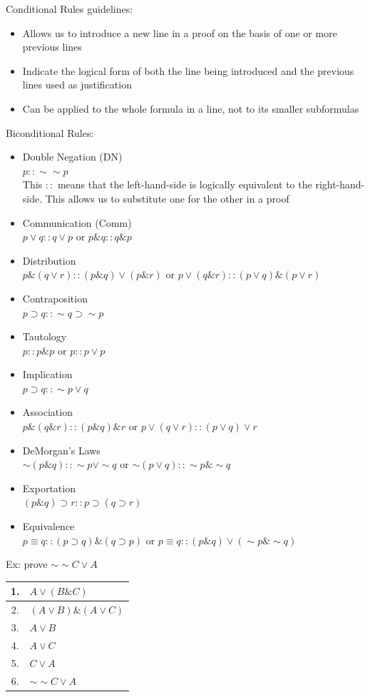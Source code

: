 \documentclass[11pt, fleqn]{article}
\begin{document}
Conditional Rules guidelines:
\begin{itemize}
    \item Allows us to introduce a new line in a proof on the basis of one or more previous lines
    \item Indicate the logical form of both the line being introduced and the previous lines used as justification
    \item Can be applied to the whole formula in a line, not to its smaller subformulas
\end{itemize}
Biconditional Rules:
\begin{itemize}
    \item Double Negation (DN)\\
    $p::\sim\sim p$\\
    This $::$ means that the left-hand-side is logically equivalent to the right-hand-side. This allows us to substitute one for the other in a proof
    \item Communication (Comm)\\
    $p\vee q::q\vee p$ or $p\& q:: q\& p$
    \item Distribution\\
    $p\&(q\vee r)::(p\& q)\vee(p\& r)$ or $p\vee(q\& r)::(p\vee q)\&(p\vee r)$
    \item Contraposition\\
    $p\supset q::\sim q\supset\sim p$
    \item Tautology\\
    $p::p\& p$ or $p::p\vee p$
    \item Implication\\
    $p\supset q::\sim p\vee q$
    \item Association\\
    $p\&(q\& r)::(p\& q)\& r$ or $p\vee(q\vee r)::(p\vee q)\vee r$
    \item DeMorgan's Laws\\
    $\sim(p\& q)::\sim p\vee\sim q$ or $\sim(p\vee q)::\sim p\&\sim q$
    \item Exportation\\
    $(p\& q)\supset r::p\supset(q\supset r)$
    \item Equivalence\\
    $p\equiv q::(p\supset q)\&(q\supset p)$ or $p\equiv q::(p\& q)\vee(\sim p\&\sim q)$
\end{itemize}
Ex: prove $\sim\sim C\vee A$\\
\begin{tabular}{cl}
    1. & $A\vee(B\& C)$\\
    \hline
    2. & $(A\vee B)\&(A\vee C)$\\
    3. & $A\vee B$\\
    4. & $A\vee C$\\
    5. & $C\vee A$\\
    6. & $\sim\sim C\vee A$
\end{tabular}\\
\end{document}
